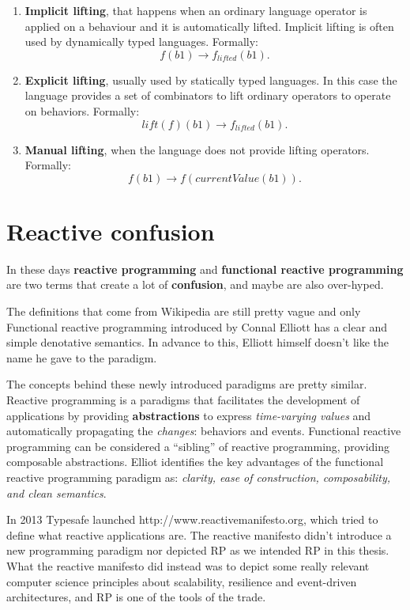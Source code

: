 \begin{enumerate}
\def\labelenumi{\arabic{enumi}.}
\item
  \textbf{Implicit lifting}, that happens when an ordinary language
  operator is applied on a behaviour and it is automatically lifted.
  Implicit lifting is often used by dynamically typed languages.
  Formally: \[
  f(b1)  \rightarrow f_{lifted}(b1) .
  \]
\item
  \textbf{Explicit lifting}, usually used by statically typed languages.
  In this case the language provides a set of combinators to lift
  ordinary operators to operate on behaviors. Formally: \[
  lift(f)(b1)  \rightarrow f_{lifted}(b1) .
  \]
\item
  \textbf{Manual lifting}, when the language does not provide lifting
  operators. Formally: \[
  f(b1)  \rightarrow f(currentValue(b1)) .
  \]
\end{enumerate}


\section{Reactive confusion}\label{reactive-confusion}

In these days \textbf{reactive programming} and \textbf{functional
reactive programming} are two terms that create a lot of
\textbf{confusion}, and maybe are also over-hyped.

The definitions that come from Wikipedia are still pretty vague and only
Functional reactive programming introduced by Connal Elliott has a clear
and simple denotative semantics. In advance to this, Elliott himself
doesn't like the name he gave to the paradigm.

The concepts behind these newly introduced paradigms are pretty similar.
Reactive programming is a paradigms that facilitates the development of
applications by providing \textbf{abstractions} to express
\emph{time-varying values} and automatically propagating the
\emph{changes}: behaviors and events. Functional reactive programming
can be considered a ``sibling'' of reactive programming, providing
composable abstractions. Elliot identifies the key advantages of the
functional reactive programming paradigm as: \emph{clarity, ease of
construction, composability, and clean semantics}.

In 2013 Typesafe launched http://www.reactivemanifesto.org, which tried
to define what reactive applications are. The reactive manifesto didn't
introduce a new programming paradigm nor depicted RP as we intended RP
in this thesis. What the reactive manifesto did instead was to depict
some really relevant computer science principles about scalability,
resilience and event-driven architectures, and RP is one of the tools of
the trade.


